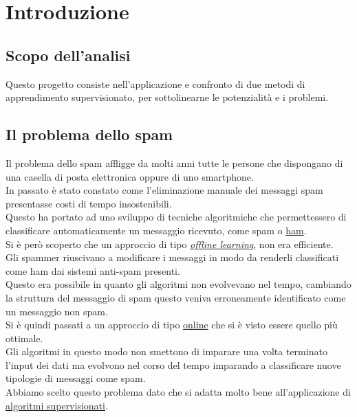 \newpage
\section{Introduzione}
\subsection{Scopo dell'analisi}
Questo progetto consiste nell'applicazione e confronto di due metodi di  apprendimento supervisionato, per sottolinearne le potenzialità e i problemi.

\subsection{Il problema dello spam}
Il problema dello spam affligge da molti anni tutte le persone che dispongano di una casella di posta elettronica oppure di uno smartphone.\\
In passato è stato constato come l'eliminazione manuale dei messaggi spam presentasse costi di tempo insostenibili.\\
Questo ha portato ad uno sviluppo di tecniche algoritmiche che permettessero di classificare automaticamente un messaggio ricevuto, come spam o \href{https://en.wiktionary.org/wiki/ham_e-mail}{ham}.\\
Si è però scoperto che un approccio di tipo \href{https://en.wikipedia.org/wiki/Offline_learning}{\textit{offline learning}}, non era efficiente.\\
Gli spammer riuscivano a modificare i messaggi in modo da renderli classificati come ham dai sistemi anti-spam presenti.\\
Questo era possibile in quanto gli algoritmi non evolvevano nel tempo, cambiando la struttura del messaggio di spam questo veniva erroneamente identificato come un messaggio non spam.\\
Si è quindi passati a un approccio di tipo \href{https://en.wikipedia.org/wiki/Online_algorithm}{online} che si è visto essere quello più ottimale.\\
Gli algoritmi in questo modo non smettono di imparare una volta terminato l'input dei dati ma evolvono nel corso del tempo imparando a classificare nuove tipologie di messaggi come spam.\\
Abbiamo scelto questo problema dato che si adatta molto bene all'applicazione di \href{https://en.wikipedia.org/wiki/Supervised_learning}{algoritmi supervisionati}. 
